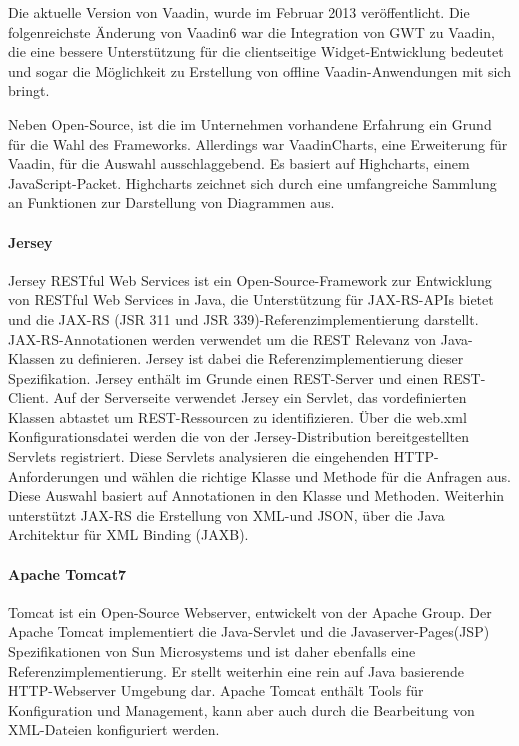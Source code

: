 Die aktuelle Version von Vaadin, wurde im Februar 2013 veröffentlicht. Die folgenreichste Änderung von Vaadin6 war die Integration von GWT zu Vaadin, die eine bessere Unterstützung für die clientseitige Widget-Entwicklung bedeutet und sogar die Möglichkeit zu Erstellung von offline Vaadin-Anwendungen mit sich bringt.

Neben Open-Source, ist die im Unternehmen vorhandene Erfahrung ein Grund für die Wahl des Frameworks. Allerdings war VaadinCharts, eine Erweiterung für Vaadin, für die Auswahl ausschlaggebend. Es basiert auf Highcharts, einem JavaScript-Packet. Highcharts zeichnet sich durch eine umfangreiche Sammlung an Funktionen zur Darstellung von Diagrammen aus. 

\paragraph{Jersey}

Jersey RESTful Web Services ist ein Open-Source-Framework zur Entwicklung von RESTful Web Services in Java, die Unterstützung für JAX-RS-APIs bietet und die JAX-RS (JSR 311 und JSR 339)-Referenzimplementierung darstellt. JAX-RS-Annotationen werden verwendet um die REST Relevanz von Java-Klassen zu definieren. Jersey ist dabei die Referenzimplementierung dieser Spezifikation. Jersey enthält im Grunde einen REST-Server und einen REST-Client. Auf der Serverseite verwendet Jersey ein Servlet, das vordefinierten Klassen abtastet um REST-Ressourcen zu identifizieren. Über die web.xml Konfigurationsdatei werden die von der Jersey-Distribution bereitgestellten Servlets registriert. Diese Servlets analysieren die eingehenden HTTP-Anforderungen und wählen die richtige Klasse und Methode für die Anfragen aus. Diese Auswahl basiert auf Annotationen in den Klasse und Methoden. Weiterhin unterstützt JAX-RS die Erstellung von XML-und JSON, über die Java Architektur für XML Binding (JAXB).

\paragraph{Apache Tomcat7}

Tomcat ist ein Open-Source Webserver, entwickelt von der Apache Group. Der Apache Tomcat implementiert die Java-Servlet und die Javaserver-Pages(JSP) Spezifikationen von Sun Microsystems und ist daher ebenfalls eine Referenzimplementierung. Er stellt weiterhin eine rein auf Java basierende HTTP-Webserver Umgebung dar. Apache Tomcat enthält Tools für Konfiguration und Management, kann aber auch durch die Bearbeitung von XML-Dateien konfiguriert werden.

